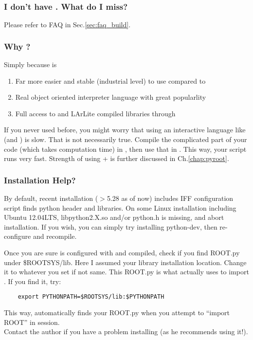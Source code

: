 \subsubsection{I don't have \clang. What do I miss?}
Please refer to FAQ in Sec.\ref{sec:faq_build}.

\subsubsection{Why \PyROOT?}
Simply because \python is 
\begin{enumerate}
\item Far more easier and stable (industrial level) to use compared to \CINT
\item Real object oriented interpreter language with great popularlity 
\item Full access to \ROOT and LArLite compiled libraries through \PyROOT
\end{enumerate}
If you never used \PyROOT before, you might worry that using an interactive language like \python (and \CINT) is slow.
That is not necessarily true. 
Compile the complicated part of your code (which takes computation time) in \CPP, then use that in \python. 
This way, your \python script runs very fast.
Strength of using \python + \PyROOT is further discussed in Ch.\ref{chap:pyroot}.

\subsubsection{\PyROOT Installation Help?}
\label{sec:pyroothelp}
By default, recent \ROOT installation ($>$5.28 as of now) includes \PyROOT IFF \ROOT configuration script finds python header and libraries. 
On some Linux installation including Ubuntu 12.04LTS, {\ttfamily libpython2.X.so} and/or {\ttfamily python.h} is missing, and \ROOT abort \PyROOT installation.
If you wish, you can simply try installing {\ttfamily python-dev}, then re-configure \ROOT and recompile. 

Once you are sure \ROOT is configured with \python and compiled, check if you find {\ttfamily ROOT.py} under {\ttfamily \$ROOTSYS/lib}. Here I assumed your \ROOT library installation location. Change it to whatever you set if not same. This {\ttfamily ROOT.py} is what \python actually uses to import \ROOT. If you find it, try:
\begin{lstlisting}
    export PYTHONPATH=$ROOTSYS/lib:$PYTHONPATH
\end{lstlisting}
This way, \python automatically finds your {\ttfamily ROOT.py} when you attempt to ``import ROOT'' in \python session.\\

\noindent Contact the author if you have a problem installing \PyROOT (as he recommends using it!).








